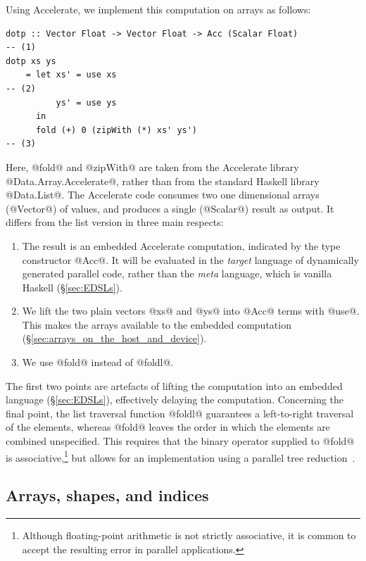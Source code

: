 Using Accelerate, we implement this computation on arrays as follows:
%
\begin{lstlisting}[style=haskell]
dotp :: Vector Float -> Vector Float -> Acc (Scalar Float)                         -- (1)
dotp xs ys
    = let xs' = use xs                                                             -- (2)
          ys' = use ys
      in
      fold (+) 0 (zipWith (*) xs' ys')                                             -- (3)
\end{lstlisting}
%
Here, @fold@ and @zipWith@ are taken from the Accelerate library
@Data.Array.Accelerate@, rather than from the standard Haskell library
@Data.List@. The Accelerate code consumes two one dimensional arrays (@Vector@)
of values, and produces a single (@Scalar@) result as output. It differs from
the list version in three main respects:
%
\begin{enumerate}
    \item The result is an embedded Accelerate computation, indicated by the
        type constructor @Acc@. It will be evaluated in the \emph{target}
        language\lang[target]{} of dynamically generated parallel code, rather
        than the \emph{meta} language\lang[object]{}, which is vanilla Haskell
        (\S\ref{sec:EDSLs}).

    \item We lift the two plain vectors @xs@ and @ys@ into @Acc@ terms with
        @use@. This makes the arrays available to the embedded computation
        (\S\ref{sec:arrays_on_the_host_and_device}).

    \item We use @fold@ instead of @foldl@.
\end{enumerate}
%
The first two points are artefacts of lifting the computation into an embedded
language (\S\ref{sec:EDSLs}), effectively delaying the computation. Concerning
the final point, the list traversal function @foldl@ guarantees a left-to-right
traversal of the elements, whereas @fold@ leaves the order in which the elements
are combined unspecified. This requires that the binary operator supplied to
@fold@ is associative,\footnote{Although floating-point
arithmetic is not strictly associative, it is common to accept the resulting
error in parallel applications.} but allows for an implementation using a
parallel tree reduction~\cite{Chatterjee:1990vj,Sengupta:2007tc}.


\subsection{Arrays, shapes, and indices}
\label{sec:arrays_shapes_and_indices}

